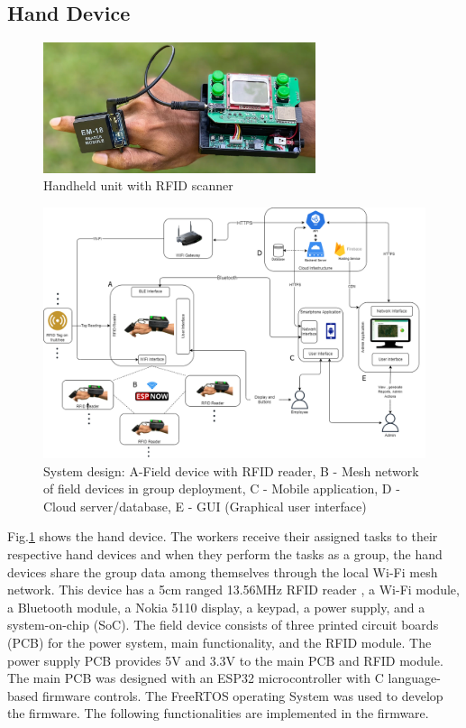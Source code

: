 \documentclass[journal]{IEEEtran}
\begin{document}
\subsection{Hand Device}
\begin{figure}[]
	\centering
	\includegraphics[width = 8cm]{graphics/handheld.png}
	\caption{Handheld unit with RFID scanner}
	\label{fig_handheld}
\end{figure}
\begin{figure}
	\centering
	\includegraphics[width = 17cm]{graphics/system.png}
	\caption{System design: A-Field device with RFID reader, B - Mesh network of field devices in group deployment, C - Mobile application, D - Cloud server/database, E - GUI (Graphical user interface)}
	\label{fig_system}
\end{figure}
Fig.\ref{fig_handheld} shows the hand device. The workers receive their assigned tasks to their respective hand devices and when they perform the tasks as a group, the hand devices share the group data among themselves through the local Wi-Fi mesh network. This device has a 5cm ranged 13.56MHz RFID reader \cite{rfid_1356Mz}, a Wi-Fi module, a Bluetooth module, a Nokia 5110 display, a keypad, a power supply, and a system-on-chip (SoC). The field device consists of three printed circuit boards (PCB) for the power system, main functionality, and the RFID module. The power supply PCB provides 5V and 3.3V to the main PCB and RFID module. The main PCB was designed with an ESP32 microcontroller with C language-based firmware controls. The FreeRTOS operating System \cite{rtos} was used to develop the firmware. The following functionalities are implemented in the firmware.
\end{document}
